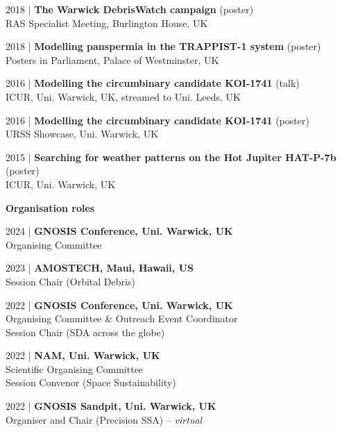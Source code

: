 \documentclass[10pt,a4paper]{altacv}
\begin{document}
\smallskip

\small 2018 | \textbf{The Warwick DebrisWatch campaign} (poster) \\
RAS Specialist Meeting, Burlington House, UK

\smallskip

\small 2018 | \textbf{Modelling panspermia in the TRAPPIST-1 system} (poster) \\
Posters in Parliament, Palace of Westminster, UK

\smallskip

\small 2016 | \textbf{Modelling the circumbinary candidate KOI-1741} (talk) \\
ICUR, Uni. Warwick, UK, streamed to Uni. Leeds, UK

\smallskip

\small 2016 | \textbf{Modelling the circumbinary candidate KOI-1741} (poster) \\
URSS Showcase, Uni. Warwick, UK

\smallskip

\small 2015 | \textbf{Searching for weather patterns on the Hot Jupiter HAT-P-7b} (poster) \\
ICUR, Uni. Warwick, UK

\divider

\normalsize \textbf{Organisation roles}

\medskip

\small 2024 | \textbf{GNOSIS Conference, Uni. Warwick, UK} \\
Organising Committee

\smallskip

\small 2023 | \textbf{AMOSTECH, Maui, Hawaii, US} \\
Session Chair (Orbital Debris)

\smallskip

\small 2022 | \textbf{GNOSIS Conference, Uni. Warwick, UK} \\
Organising Committee \& Outreach Event Coordinator \\
Session Chair (SDA across the globe)

\smallskip

\small 2022 | \textbf{NAM, Uni. Warwick, UK} \\
Scientific Organising Committee \\
Session Convenor (Space Sustainability)

\smallskip

\small 2022 | \textbf{GNOSIS Sandpit, Uni. Warwick, UK} \\
Organiser and Chair (Precision SSA) -- \textit{virtual}
\end{document}
